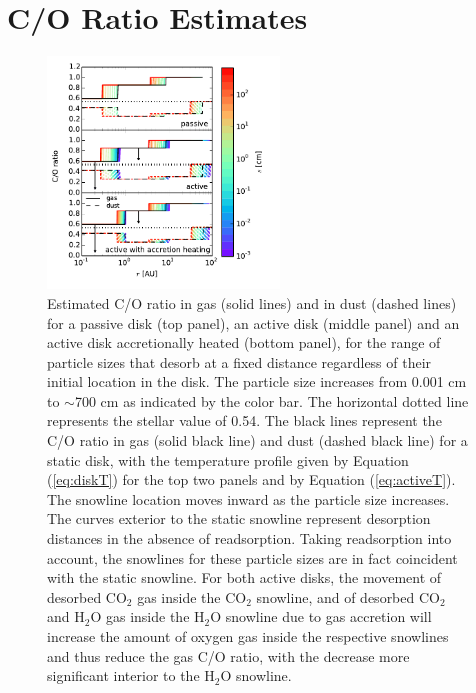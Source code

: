 \documentclass[apj]{emulateapj}
\newcommand{\emgr}[1]{\emph{ \color{gray} #1}}
\begin{document}


\section{C/O Ratio Estimates}
\label{sec:COratio}

\begin{figure}[h!]
\centering
\includegraphics[width=0.55\textwidth]{C_O_ratio_passive_active_disk_many_colorbar_complete_new.pdf}
\caption{Estimated C/O ratio in gas (solid lines) and in dust (dashed lines) for a passive disk (top panel), an active disk (middle panel) and an active disk accretionally heated (bottom panel), for the range of particle sizes that desorb at a fixed distance regardless of their initial location in the disk. The particle size increases from 0.001 cm to $\sim$700 cm as indicated by the color bar. The horizontal dotted line represents the stellar value of 0.54. The black lines represent the C/O ratio in gas (solid black line) and dust (dashed black line) for a static disk, with the temperature profile given by Equation (\ref{eq:diskT}) for the top two panels and by Equation (\ref{eq:activeT}). The snowline location moves inward as the particle size increases. The curves exterior to the static snowline represent desorption distances in the absence of readsorption.  Taking  readsorption into account, the snowlines for these particle sizes are in fact coincident with the static snowline. For both active disks, the movement of desorbed CO$_2$ gas inside the CO$_2$ snowline, and of desorbed CO$_2$ and H$_2$O gas inside the H$_2$O snowline due to gas accretion will increase the amount of oxygen gas inside the respective snowlines and thus reduce the gas C/O ratio, with the decrease more significant interior to the H$_2$O snowline.}
\label{fig:CO_ratio}
\end{figure}
\end{document}
